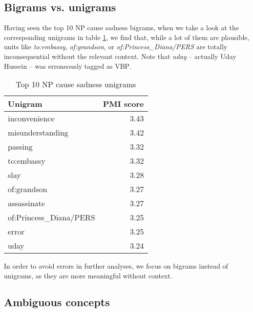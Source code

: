 \subsection{Bigrams vs. unigrams}

Having seen the top 10 NP cause sadness bigrams, when we take a look at the corresponding unigrams in table \ref{tab:sadness-unigrams}, we find that, while a lot of them are plausible, units like \textit{to:embassy}, \textit{of:grandson}, or \textit{of:Princess\_Diana/PERS} are totally inconsequential without the relevant context. Note that \textit{uday} -- actually Uday Hussein -- was erroneously tagged as \textsc{VBP}.

\begin{table}[h]
\centering
\begin{tabular}{l|r}
{\bf Unigram}                                    & {\bf PMI score} \\\hline
inconvenience                                    & 3.43            \\
misunderstanding                                 & 3.42            \\
passing                                          & 3.32            \\
to:embassy                                       & 3.32            \\
slay                                             & 3.28            \\
of:grandson                                      & 3.27            \\
assassinate                                      & 3.27            \\
of:Princess\_Diana/PERS                          & 3.25            \\
error                                            & 3.25            \\
uday                                             & 3.24              
\end{tabular}
\caption{Top 10 NP cause sadness unigrams}
\label{tab:sadness-unigrams}
\end{table}

In order to avoid errors in further analyses, we focus on bigrams instead of unigrams, as they are more meaningful without context.

\subsection{Ambiguous concepts}


